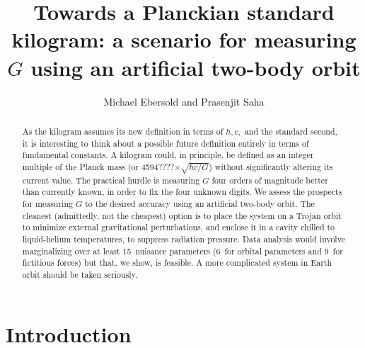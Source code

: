 \documentclass[]{rsos}
\begin{document}
\title{Towards a Planckian standard kilogram:
a scenario for measuring $G$ using an artificial two-body orbit}

\author{Michael Ebersold and Prasenjit Saha}

\address{Physik-Institut, University of Zurich, Winterthurerstrasse
  190, 8057 Zurich, Switzerland}

\subject{xxxxx, xxxxx, xxxx}




\begin{abstract}
{As the kilogram assumes its new definition in terms of $h,c,$ and the
  standard second, it is interesting to think about a possible future
  definition entirely in terms of fundamental constants.
  A kilogram could, in principle, be defined as an integer multiple of
  the Planck mass (or 4594????$\times\sqrt{\hbar c/G}$) without
  significantly altering its current value.  The practical hurdle is
  measuring $G$ four orders of magnitude better than currently known,
  in order to fix the four unknown digits.}
{We assess the prospects for measuring $G$ to the desired accuracy
  using an artificial two-body orbit.}
{The cleanest (admittedly, not the cheapest) option is to place the
  system on a Trojan orbit to minimize external gravitational
  perturbations, and enclose it in a cavity chilled to liquid-helium
  temperatures, to suppress radiation pressure.}
{Data analysis would involve marginalizing over at least 15~nuisance
  parameters (6~for orbital parameters and 9~for fictitious forces)
  but that, we show, is feasible.}
{A more complicated system in Earth orbit should be taken seriously.}
\end{abstract}

\maketitle

\section{Introduction}
\end{document}
